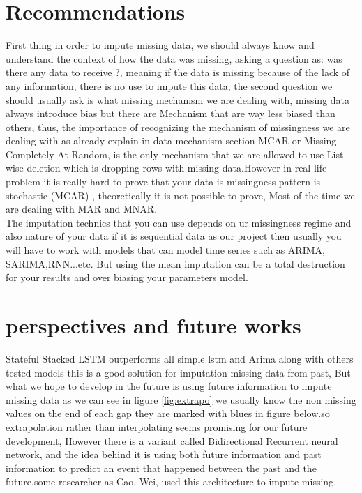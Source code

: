 \section{Recommendations}
First thing in order to impute missing data, we should always know and understand the context of how the data was missing, asking a question as:  was there any data to receive ?, meaning if the data is missing because of the lack of any information, there is no use to impute this data, the second question we should usually ask is what missing mechanism we are dealing with, missing data always introduce bias but there are Mechanism that are way less biased than others, thus, the importance of recognizing the mechanism of missingness we are dealing with as already explain in data mechanism section MCAR or Missing Completely At Random, is the only mechanism that we are allowed to  use List-wise deletion which is dropping rows with missing data.However in real life problem it is really hard to prove that your data is missingness pattern is stochastic (MCAR) , theoretically it is not possible to prove, Most of the time we are dealing with MAR and MNAR.\\The imputation technics that you can use depends on ur missingness regime and also nature of your data if it is sequential data as our project then usually you will have to work with models that can model time series such as ARIMA, SARIMA,RNN...etc. But using the mean imputation can be a total destruction for your results and over biasing your parameters model.

\section{perspectives and future works }

Stateful Stacked LSTM outperforms all simple lstm and Arima along with others tested models this is a good solution for imputation missing data from past, But what we hope to develop in the future is using future information to impute missing data as we can see in figure \ref{fig:extrapo}  we usually know the non missing values on the end of each gap they are marked with blues in figure below.so extrapolation rather than interpolating seems promising for our future development, However there is a variant called Bidirectional Recurrent neural network, and the idea behind it is using both future information and past information  to predict an event that happened between the past and the future,some researcher as Cao, Wei, \cite{brits} used this architecture to impute missing. 

